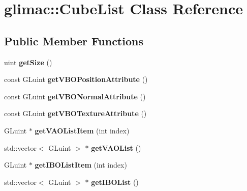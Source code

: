 \hypertarget{classglimac_1_1CubeList}{}\section{glimac\+:\+:Cube\+List Class Reference}
\label{classglimac_1_1CubeList}
\subsection*{Public Member Functions}
\begin{DoxyCompactItemize}
\item 
\mbox{\label{classglimac_1_1CubeList_a22bdb56a8ad725631572e517234ac775}} 
uint {\bfseries get\+Size} ()
\item 
\mbox{\label{classglimac_1_1CubeList_a849ccb890002bf4c1f0692741219e076}} 
const G\+Luint {\bfseries get\+V\+B\+O\+Position\+Attribute} ()
\item 
\mbox{\label{classglimac_1_1CubeList_a540ce314986990e41f51dfeafdb5fede}} 
const G\+Luint {\bfseries get\+V\+B\+O\+Normal\+Attribute} ()
\item 
\mbox{\label{classglimac_1_1CubeList_aa1d8214db32aa1e60d77b18559f0a2eb}} 
const G\+Luint {\bfseries get\+V\+B\+O\+Texture\+Attribute} ()
\item 
\mbox{\label{classglimac_1_1CubeList_a46cfba24380b3421086a0ac97ae4e789}} 
G\+Luint $\ast$ {\bfseries get\+V\+A\+O\+List\+Item} (int index)
\item 
\mbox{\label{classglimac_1_1CubeList_aeb6239962da1abae9cfc0e773b71c485}} 
std\+::vector$<$ G\+Luint $>$ $\ast$ {\bfseries get\+V\+A\+O\+List} ()
\item 
\mbox{\label{classglimac_1_1CubeList_a1b1b153b8b2171e65e9c040cfa424892}} 
G\+Luint $\ast$ {\bfseries get\+I\+B\+O\+List\+Item} (int index)
\item 
\mbox{\label{classglimac_1_1CubeList_acd588ce7b0feb5f2fc72d6579887e47e}} 
std\+::vector$<$ G\+Luint $>$ $\ast$ {\bfseries get\+I\+B\+O\+List} ()

\end{DoxyCompactItemize}
